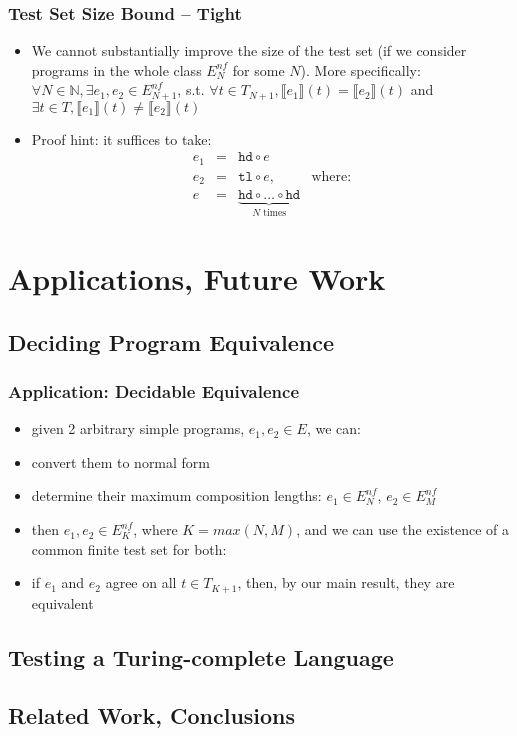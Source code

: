 \documentclass{beamer}
\begin{document}
\begin{frame}
  \frametitle{Test Set Size Bound -- Tight}
  \begin{itemize}
    \item We cannot substantially improve the size of the test set 
    (if we consider programs in the whole class $E^{nf}_N$ for some $N$).
    More specifically: 
    $\forall N \in \mathbb{N}, \exists e_1, e_2 \in E^{nf}_{N+1}$, s.t.
    $\forall t \in T_{N+1}, \llbracket e_1 \rrbracket (t) = \llbracket e_2 \rrbracket (t)$ and
    $\exists t \in T, \llbracket e_1 \rrbracket (t) \neq \llbracket e_2 \rrbracket (t)$
	\item Proof hint: it suffices to take:
	  \[\begin{array}{lclr}
	  e_1 & = & \texttt{hd} \circ e & \\
	  e_2 & = & \texttt{tl} \circ e, & \text{where:} \\
	  e & = & \underbrace{\texttt{hd} \circ \ldots \circ \texttt{hd}}_{N \text{ times}}
	  \end{array}
	  \]      
  \end{itemize}
\end{frame}

\section{Applications, Future Work}

\subsection{Deciding Program Equivalence}

\begin{frame}
  \frametitle{Application: Decidable Equivalence}
  \begin{itemize}
    \item given 2 arbitrary simple programs, $e_1, e_2 \in E$, we can:
    \item convert them to normal form
    \item determine their maximum composition lengths: $e_1 \in E^{nf}_N$, $e_2 \in E^{nf}_M$
    \item then $e_1, e_2 \in E^{nf}_K$, where $K = {\mathit{max}(N, M)}$, and we can use the
      existence of a common finite test set for both:
    \item if $e_1$ and $e_2$ agree on all $t \in T_{K+1}$, then, by
      our main result, they are equivalent
  \end{itemize}
\end{frame}


\subsection{Testing a Turing-complete Language}

\subsection{Related Work, Conclusions} %
\end{document}
